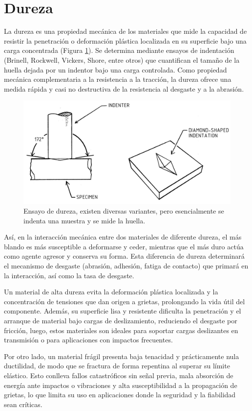 \section{Dureza}

La dureza es una propiedad mecánica de los materiales que mide la capacidad de resistir la penetración o deformación plástica localizada en su superficie bajo una carga concentrada (Figura \ref{dur}). Se determina mediante ensayos de indentación (Brinell, Rockwell, Vickers, Shore, entre otros) que cuantifican el tamaño de la huella dejada por un indentor bajo una carga controlada. Como propiedad mecánica complementaria a la resistencia a la tracción, la dureza ofrece una medida rápida y casi no destructiva de la resistencia al desgaste y a la abrasión.

\begin{figure}[h!]
    \centering
    \includegraphics[width=0.7\linewidth]{imgs/indent.png}
    \caption{Ensayo de dureza, existen diversas variantes, pero esencialmente se indenta una muestra y se mide la huella.}
    \label{dur}
\end{figure}

Así, en la interacción mecánica entre dos materiales de diferente dureza, el más blando es más susceptible a deformarse y ceder, mientras que el más duro actúa como agente agresor y conserva su forma. Esta diferencia de dureza determinará el mecanismo de desgaste (abrasión, adhesión, fatiga de contacto) que primará en la interacción, así como la tasa de desgaste.

Un material de alta dureza evita la deformación plástica localizada y la concentración de tensiones que dan origen a grietas, prolongando la vida útil del componente. Además, su superficie lisa y resistente dificulta la penetración y el arranque de material bajo cargas de deslizamiento, reduciendo el desgaste por fricción, luego, estos materiales son ideales para soportar cargas deslizantes en transmisión o para aplicaciones con impactos frecuentes.

Por otro lado, un material frágil presenta baja tenacidad y prácticamente nula ductilidad, de modo que se fractura de forma repentina al superar su límite elástico. Esto conlleva fallos catastróficos sin señal previa, mala absorción de energía ante impactos o vibraciones y alta susceptibilidad a la propagación de grietas, lo que limita su uso en aplicaciones donde la seguridad y la fiabilidad sean críticas.

